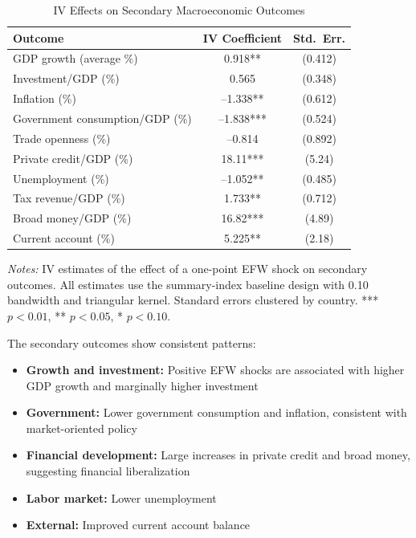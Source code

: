 \documentclass[12pt,a4paper]{article}
\begin{document}
\begin{table}[H]
\centering
\caption{IV Effects on Secondary Macroeconomic Outcomes}
\label{tab:secondary_outcomes}
\begin{threeparttable}
\begin{tabular}{lcc}
\toprule
Outcome & IV Coefficient & Std.\ Err. \\
\midrule
GDP growth (average \%) & 0.918** & (0.412) \\
Investment/GDP (\%) & 0.565 & (0.348) \\
Inflation (\%) & --1.338** & (0.612) \\
Government consumption/GDP (\%) & --1.838*** & (0.524) \\
Trade openness (\%) & --0.814 & (0.892) \\
Private credit/GDP (\%) & 18.11*** & (5.24) \\
Unemployment (\%) & --1.052** & (0.485) \\
Tax revenue/GDP (\%) & 1.733** & (0.712) \\
Broad money/GDP (\%) & 16.82*** & (4.89) \\
Current account (\%) & 5.225** & (2.18) \\
\bottomrule
\end{tabular}
\begin{tablenotes}
\small
\item \textit{Notes:} IV estimates of the effect of a one-point EFW 
shock on secondary outcomes. All estimates use the summary-index baseline 
design with 0.10 bandwidth and triangular kernel. Standard errors 
clustered by country. *** $p < 0.01$, ** $p < 0.05$, * $p < 0.10$.
\end{tablenotes}
\end{threeparttable}
\end{table}

The secondary outcomes show consistent patterns:
\begin{itemize}[noitemsep]
    \item \textbf{Growth and investment:} Positive EFW shocks are 
    associated with higher GDP growth and marginally higher investment
    \item \textbf{Government:} Lower government consumption and inflation, 
    consistent with market-oriented policy
    \item \textbf{Financial development:} Large increases in private 
    credit and broad money, suggesting financial liberalization
    \item \textbf{Labor market:} Lower unemployment
    \item \textbf{External:} Improved current account balance
\end{itemize}
\end{document}
